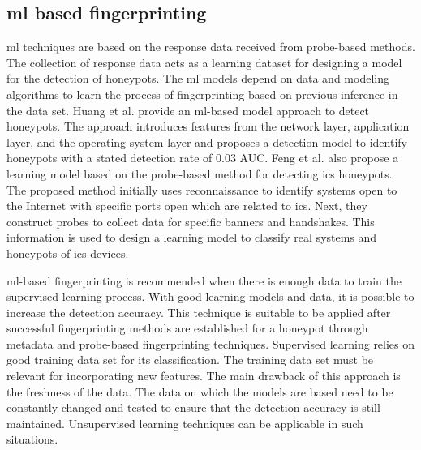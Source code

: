 \subsection{\acrfull{ml} based fingerprinting}
\acrfull{ml} techniques are based on the response data received from probe-based methods. The collection of response data acts as a learning dataset for designing a model for the detection of honeypots. The \acrshort{ml} models depend on data and modeling algorithms to learn the process of fingerprinting based on previous inference in the data set. Huang et al.  provide an \acrshort{ml}-based model approach to detect honeypots\cite{huang}. The approach introduces features from the network layer, application layer, and the operating system layer and proposes a detection model to identify honeypots with a stated detection rate of 0.03 AUC. Feng et al. \cite{Feng2016} also propose a learning model based on the probe-based method for detecting \acrshort{ics} honeypots. The proposed method initially uses reconnaissance to identify systems open to the Internet with specific ports open which are related to \acrshort{ics}. Next, they construct probes to collect data for specific banners and handshakes. This information is used to design a learning model to classify real systems and honeypots of \acrshort{ics} devices.

\acrshort{ml}-based fingerprinting is recommended when there is enough data to train the supervised learning process. With good learning models and data, it is possible to increase the detection accuracy. This technique is suitable to be applied after successful fingerprinting methods are established for a honeypot through metadata and probe-based fingerprinting techniques. Supervised learning relies on good training data set for its classification. The training data set must be relevant for incorporating new features. The main drawback of this approach is the freshness of the data. The data on which the models are based need to be constantly changed and tested to ensure that the detection accuracy is still maintained. Unsupervised learning techniques can be applicable in such situations. 
